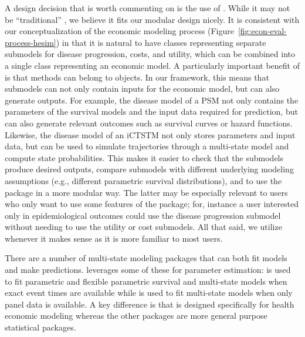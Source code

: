 \documentclass[article, nojss]{jss}\usepackage[]{graphicx}\usepackage[]{color}
\begin{document}
A design decision that is worth commenting on is the use of . While it may not be ``traditional'' , we believe it fits our modular design nicely. It is consistent with our conceptualization of the economic modeling process (Figure~\ref{fig:econ-eval-process-hesim}) in that it is natural to have classes representing separate submodels for disease progression, costs, and utility, which can be combined into a single class representing an economic model. A particularly important benefit of  is that methods can belong to objects. In our framework, this means that submodels can not only contain inputs for the economic model, but can also generate outputs. For example, the disease model of a PSM not only contains the parameters of the survival models and the input data required for prediction, but can also generate relevant outcomes such as survival curves or hazard functions. Likewise, the disease model of an iCTSTM not only stores parameters and input data, but can be used to simulate trajectories through a multi-state model and compute state probabilities. This makes it easier to check that the submodels produce desired outputs, compare submodels with different underlying modeling assumptions (e.g., different parametric survival distributions), and to use the package in a more modular way. The latter may be especially relevant to users who only want to use some features of the package; for, instance a user interested only in epidemiological outcomes could use the disease progression submodel without needing to use the utility or cost submodels. All that said, we utilize  whenever it makes sense as it is more familiar to most  users.

There are a number of multi-state modeling  packages that can both fit models and make predictions.  leverages some of these for parameter estimation:  is used to fit parametric and flexible parametric survival and multi-state models when exact event times are available while  is used to fit multi-state models when only panel data is available. A key difference is that  is designed specifically for health economic modeling whereas the other packages are more general purpose statistical packages. 
\end{document}
